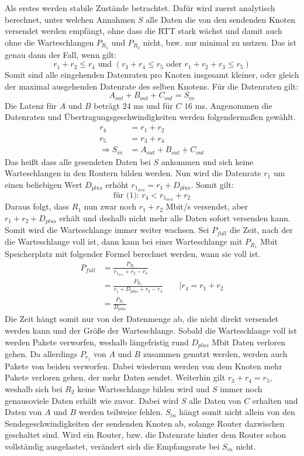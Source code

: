 \documentclass [10pt,a4paper]{article}
\begin{document}
		Als erstes werden stabile Zustände betrachtet. Dafür wird zuerst analytisch berechnet, unter welchen Annahmen $S$ alle Daten die von den sendenden Knoten versendet werden empfängt, ohne dass die RTT stark wächst und damit auch ohne die Warteschlangen $P_{R_1}$ und $P_{R_2}$ nicht, bzw. nur minimal zu nutzen.
		Das ist genau dann der Fall, wenn gilt:
		\[r_1+r_2\leq r_4 \text{ und } (r_3+r_4\leq r_5 \text{ oder } r_1+r_2+r_3\leq r_5) \]
		Somit sind alle eingehenden Datenraten pro Knoten insgesamt kleiner, oder gleich der maximal ausgehenden Datenrate des selben Knotens. Für die Datenraten gilt:
		\[A_{out}+B_{out}+C_{out}= S_{in}\]
		Die Latenz für $A$ und $B$ beträgt $24$ ms und für $C$ $16$ ms. Angenommen die Datenraten und Übertragungsgeschwindigkeiten werden folgendermaßen gewählt.
		\begin{align*}
			r_4 &=r_1+r_2 \\
			r_5 &=r_3+r_4 \\
			\Rightarrow S_{in} &=A_{out}+B_{out}+C_{out}
		\end{align*}
		Das heißt dass alle gesendeten Daten bei $S$ ankommen und sich keine Warteschlangen in den Routern bilden werden. Nun wird die Datenrate $r_1$ um einen beliebigen Wert $D_{plus}$ erhöht $r_{1_{neu}}=r_{1}+D_{plus}$. Somit gilt:
		\[\text{für (1): }r_4 < r_{1_{neu}}+r_2\]
		Daraus folgt, dass $R_1$ nun zwar noch $r_1+r_2$ Mbit/s versendet, aber $r_1+r_2+D_{plus}$ erhält und deshalb nicht mehr alle Daten sofort versenden kann. Somit wird die Warteschlange immer weiter wachsen. Sei $P_{full}$ die Zeit, nach der die Warteschlange voll ist, dann kann bei einer Warteschlange mit $P_{R_1}$ Mbit Speicherplatz mit folgender Formel berechnet werden, wann sie voll ist.
		\begin{align*}
			P_{full} &=\frac{P_{R_1}}{r_{1_{neu}}+r_2-r_4} \\
			&=\frac{P_{R_1}}{r_1+D_{plus}+r_2-r_4} \qquad | r_4=r_1+r_2 \\
			&=\frac{P_{R_1}}{D_{plus}}
		\end{align*}
		Die Zeit hängt somit nur von der Datenmenge ab, die nicht direkt versendet werden kann und der Größe der Warteschlange. Sobald die Warteschlange voll ist werden Pakete verworfen, weshalb längefristig rund $D_{plus}$ Mbit Daten verloren gehen. Da allerdings $P_{r_1}$ von $A$ und $B$ zusammen genutzt werden, werden auch Pakete von beiden verworfen. Dabei wiederum werden von dem Knoten mehr Pakete verloren gehen, der mehr Daten sendet. Weiterhin gilt $r_3+r_4=r_5$, weshalb sich bei $R_2$ keine Warteschlange bilden wird und $S$ immer noch genausoviele Daten erhält wie zuvor. Dabei wird $S$ alle Daten von $C$ erhalten und Daten von $A$ und $B$ werden teilweise fehlen. $S_{in}$ hängt somit nicht allein von den Sendegeschwindigkeiten der sendenden Knoten ab, solange Router dazwischen geschaltet sind. Wird ein Router, bzw. die Datenrate hinter dem Router schon vollständig ausgelastet, verändert sich die Empfangsrate bei $S_{in}$ nicht.
		
\end{document}
